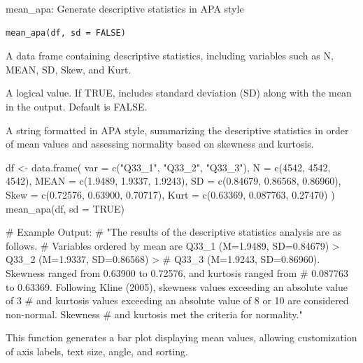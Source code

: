 \documentclass[a4paper]{book}
\begin{document}
%
\begin{Description}
mean\_apa: Generate descriptive statistics in APA style
\end{Description}
%
\begin{Usage}
\begin{verbatim}
mean_apa(df, sd = FALSE)
\end{verbatim}
\end{Usage}
%
\begin{Arguments}
\begin{ldescription}
\item[\code{df}] A data frame containing descriptive statistics, including variables such as N, MEAN, SD, Skew, and Kurt.

\item[\code{sd}] A logical value. If TRUE, includes standard deviation (SD) along with the mean in the output. Default is FALSE.
\end{ldescription}
\end{Arguments}
%
\begin{Value}
A string formatted in APA style, summarizing the descriptive statistics in order of mean values and assessing normality based on skewness and kurtosis.
\end{Value}
%
\begin{Examples}
\begin{ExampleCode}
df <- data.frame(
  var = c("Q33_1", "Q33_2", "Q33_3"),
  N = c(4542, 4542, 4542),
  MEAN = c(1.9489, 1.9337, 1.9243),
  SD = c(0.84679, 0.86568, 0.86960),
  Skew = c(0.72576, 0.63900, 0.70717),
  Kurt = c(0.63369, 0.087763, 0.27470)
)
mean_apa(df, sd = TRUE)

# Example Output:
# "The results of the descriptive statistics analysis are as follows.
# Variables ordered by mean are Q33_1 (M=1.9489, SD=0.84679) > Q33_2 (M=1.9337, SD=0.86568) >
# Q33_3 (M=1.9243, SD=0.86960). Skewness ranged from 0.63900 to 0.72576, and kurtosis ranged from
# 0.087763 to 0.63369. Following Kline (2005), skewness values exceeding an absolute value of 3
# and kurtosis values exceeding an absolute value of 8 or 10 are considered non-normal. Skewness
# and kurtosis met the criteria for normality."
\end{ExampleCode}
\end{Examples}
%
\begin{Description}
This function generates a bar plot displaying mean values, allowing customization of axis labels, text size, angle, and sorting.
\end{Description}
\end{document}
